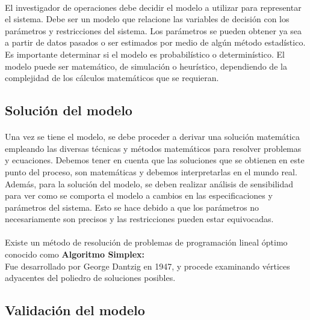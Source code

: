 \documentclass[12pt, a4paper,spanish]{article}
\begin{document}
			\paragraph{}
			El investigador de operaciones debe decidir el modelo a utilizar para representar el sistema. Debe ser un modelo que relacione las variables de decisión con los parámetros y restricciones del sistema. Los parámetros se pueden obtener ya sea a partir de datos pasados o ser estimados por medio de algún método estadístico. Es importante determinar si el modelo es probabilístico o determinístico. El modelo puede ser matemático, de simulación o heurístico, dependiendo de la complejidad de los cálculos matemáticos que se requieran. \cite{invdeop_IO}

		\subsection{Solución del modelo}

			\paragraph{}
			Una vez se tiene el modelo, se debe proceder a derivar una solución matemática empleando las diversas técnicas y métodos matemáticos para resolver problemas y ecuaciones. Debemos tener en cuenta que las soluciones que se obtienen en este punto del proceso, son matemáticas y debemos interpretarlas en el mundo real. Además, para la solución del modelo, se deben realizar análisis de sensibilidad para ver como se comporta el modelo a cambios en las especificaciones y parámetros del sistema. Esto se hace debido a que los parámetros no necesariamente son precisos y las restricciones pueden estar equivocadas. \cite{invdeop_IO}

			\paragraph{}
			Existe un método de resolución de problemas de programación lineal óptimo conocido como \textbf{Algoritmo Simplex:} \\
			Fue desarrollado por George Dantzig en 1947, y procede examinando vértices adyacentes del poliedro de soluciones posibles. \cite{wiki_simplex}

		\subsection{Validación del modelo}
\end{document}
